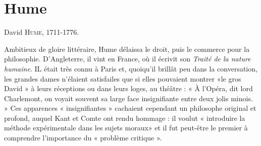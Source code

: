 
\chapter{Hume}

David \textsc{Hume}, 1711-1776.

Ambitieux de gloire littéraire, Hume délaissa
le droit, puis le commerce pour la philosophie. D'Angleterre, il vint en France, où
il écrivit son {\it Traité de la nature humaine}.
IL était très connu à Paris et, quoiqu'il
brillât peu dans la conversation, les
grandes dames n'élaient satisfailes que si
elles pouvaient montrer «le gros David »
à leurs réceptions ou dans leurs loges, au
théâtre : « À l'Opéra, dit lord Charlemont,
on voyait souvent sa large face insignifiante entre deux jolis minois. » Ces apparences « insignifiantes » cachaient cependant un philosophe original et profond,
auquel Kant et Comte ont rendu hommage : il voulut « introduire la méthode
expérimentale dans les sujets moraux»
et il fut peut-être le premier à comprendre
l'importance du « problème critique ».

